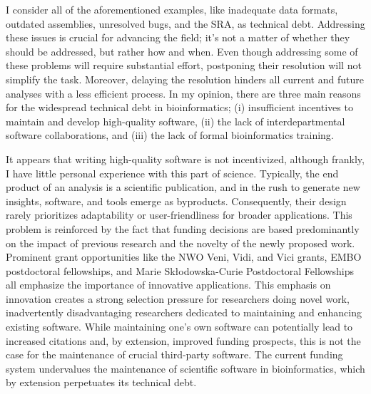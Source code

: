 I consider all of the aforementioned examples, like inadequate data formats, outdated assemblies, unresolved bugs, and the SRA, as technical debt. Addressing these issues is crucial for advancing the field; it's not a matter of whether they should be addressed, but rather how and when. Even though addressing some of these problems will require substantial effort, postponing their resolution will not simplify the task. Moreover, delaying the resolution hinders all current and future analyses with a less efficient process. In my opinion, there are three main reasons for the widespread technical debt in bioinformatics; (i) insufficient incentives to maintain and develop high-quality software, (ii) the lack of interdepartmental software collaborations, and (iii) the lack of formal bioinformatics training.

It appears that writing high-quality software is not incentivized, although frankly, I have little personal experience with this part of science. Typically, the end product of an analysis is a scientific publication, and in the rush to generate new insights, software, and tools emerge as byproducts. Consequently, their design rarely prioritizes adaptability or user-friendliness for broader applications\cite{Carpenter2024}. This problem is reinforced by the fact that funding decisions are based predominantly on the impact of previous research and the novelty of the newly proposed work. Prominent grant opportunities like the NWO Veni, Vidi, and Vici grants, EMBO postdoctoral fellowships, and Marie Skłodowska-Curie Postdoctoral Fellowships all emphasize the importance of innovative applications. This emphasis on innovation creates a strong selection pressure for researchers doing novel work, inadvertently disadvantaging researchers dedicated to maintaining and enhancing existing software. While maintaining one's own software can potentially lead to increased citations and, by extension, improved funding prospects, this is not the case for the maintenance of crucial third-party software. The current funding system undervalues the maintenance of scientific software in bioinformatics, which by extension perpetuates its technical debt.


